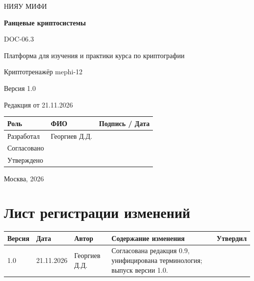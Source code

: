\documentclass[12pt,a4paper]{article}
\begin{document}
\hypersetup{pageanchor=false}
\begin{titlepage}
  \thispagestyle{empty}
  \centering
  {\large НИЯУ МИФИ\par}
  \vspace*{3.5cm}
  {\LARGE\bfseries Ранцевые криптосистемы\par}
  \vspace{0.5cm}
  {\large DOC-06.3\par}
  \vspace{0.6cm}
  {\large Платформа для изучения и практики курса по криптографии\par}
  {\large Криптотренажёр mephi-12\par}
  \vspace{0.7cm}
  {\large Версия 1.0\par}
  {\large Редакция от 21.11.2026\par}
  \vspace{1cm}
  \begin{tabularx}{\textwidth}{@{}p{3.4cm}Xp{4cm}@{}}
    \toprule
    Роль & ФИО & Подпись / Дата \\
    \midrule
    Разработал & Георгиев Д.Д. & \\
    \addlinespace[6pt]
    Согласовано & & \\
    \addlinespace[6pt]
    Утверждено & & \\
    \bottomrule
  \end{tabularx}
  \vfill
  {\large Москва, 2026\par}
\end{titlepage}
\hypersetup{pageanchor=true}

\section*{Лист регистрации изменений}
\begingroup\small\singlespacing
\noindent
\begin{tabularx}{\textwidth}{@{}p{1.2cm}p{2cm}p{2.5cm}Xp{1.8cm}@{}}
\toprule
Версия & Дата & Автор & Содержание изменения & Утвердил \\
\midrule
1.0 & 21.11.2026 & Георгиев Д.Д. & Согласована редакция 0.9, унифицирована терминология; выпуск версии 1.0. & \\
\bottomrule
\end{tabularx}
\endgroup
\clearpage
\begingroup\small\singlespacing
\tableofcontents
\endgroup
\clearpage

\hypertarget{doc-063-ранцевые-криптосистемы}{}
\end{document}
